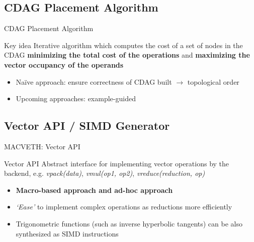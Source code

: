 \documentclass[xcolor=table,hideothersubsections,aspectratio=1610]{beamer}
\begin{document}
\subsection{CDAG Placement Algorithm}
\begin{frame}{CDAG Placement Algorithm}
\begin{block}{Key idea}
Iterative algorithm which computes the cost of a set of nodes in the CDAG \textbf{minimizing the total cost of the operations} and \textbf{maximizing the vector occupancy of the operands}
\end{block}

\begin{itemize}
    \item Naïve approach: ensure correctness of CDAG built $\rightarrow$ topological order
    \item Upcoming approaches: example-guided
\end{itemize}

\end{frame}


\subsection{Vector API / SIMD Generator}
\begin{frame}{MACVETH: Vector API}
\begin{block}{Vector API}
Abstract interface for implementing vector operations by the backend, e.g.\textit{ vpack(data)}, \textit{vmul(op1, op2)}, \textit{vreduce(reduction, op)}
\end{block}
\begin{itemize}
    \item \textbf{Macro-based approach and ad-hoc approach}
    \item \textit{`Ease'} to implement complex operations as reductions more efficiently
    \item Trigonometric functions (such as inverse hyperbolic tangents) can be also synthesized as SIMD instructions
\end{itemize}
\end{frame}


\end{document}
